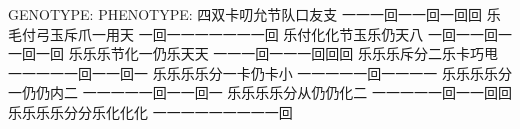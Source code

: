 GENOTYPE:              PHENOTYPE:              
四双卡叨允节队口友支   一一一回一一回一回回
乐毛付弓玉斥爪一用天   一回一一一一一一一回
乐付化化节玉乐仍天八   一回一一回一一回一回
乐乐乐节化一仍乐天天   一一一回一一一回回回
乐乐乐斥分二乐卡巧甩   一一一一一回一一回一
乐乐乐乐分一卡仍卡小   一一一一一回一一一一
乐乐乐乐分一仍仍内二   一一一一一回一一回一
乐乐乐乐分从仍仍化二   一一一一一回一一回回
乐乐乐乐分分乐化化化   一一一一一一一一一回
